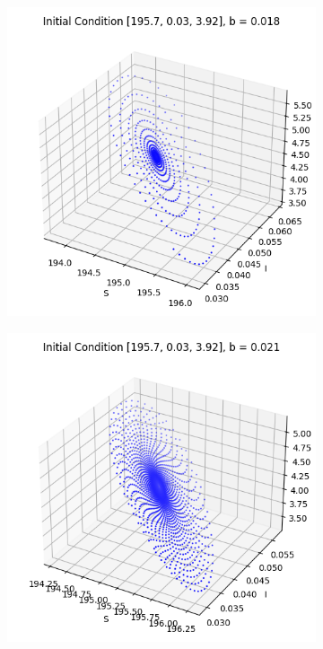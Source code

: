 \begin{itemize}
\begin{figure}[H]
\begin{subfigure}[b]{0.3\textwidth}
    \label{fig:subfig_b7}
\end{subfigure}
\begin{subfigure}[b]{0.3\textwidth}
    \centering
    \includegraphics[width=\textwidth]{images/task5/ex4_t5_2_b_9.png}
    \label{fig:subfig_b9}
\end{subfigure}
\begin{subfigure}[b]{0.3\textwidth}
    \centering
    \includegraphics[width=\textwidth]{images/task5/ex4_t5_2_b_12.png}

\end{subfigure}
\end{figure}
\end{itemize}

